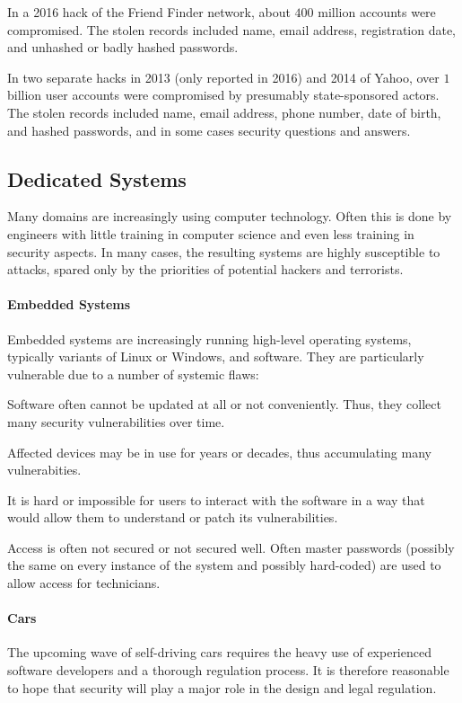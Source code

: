 In a 2016 hack of the Friend Finder network, about $400$ million accounts were compromised.
The stolen records included name, email address, registration date, and unhashed or badly hashed passwords.

In two separate hacks in 2013 (only reported in 2016) and 2014 of Yahoo, over $1$ billion user accounts were compromised by presumably state-sponsored actors.
The stolen records included name, email address, phone number, date of birth, and hashed passwords, and in some cases security questions and answers.

\subsection{Dedicated Systems}

Many domains are increasingly using computer technology.
Often this is done by engineers with little training in computer science and even less training in security aspects.
In many cases, the resulting systems are highly susceptible to attacks, spared only by the priorities of potential hackers and terrorists.

\paragraph{Embedded Systems}
Embedded systems are increasingly running high-level operating systems, typically variants of Linux or Windows, and software.
They are particularly vulnerable due to a number of systemic flaws:
\begin{compactitem}
\item Software often cannot be updated at all or not conveniently. Thus, they collect many security vulnerabilities over time.
\item Affected devices may be in use for years or decades, thus accumulating many vulnerabities.
\item It is hard or impossible for users to interact with the software in a way that would allow them to understand or patch its vulnerabilities.
\item Access is often not secured or not secured well.
Often master passwords (possibly the same on every instance of the system and possibly hard-coded) are used to allow access for technicians.
\end{compactitem}

\paragraph{Cars}
The upcoming wave of self-driving cars requires the heavy use of experienced software developers and a thorough regulation process.
It is therefore reasonable to hope that security will play a major role in the design and legal regulation.

